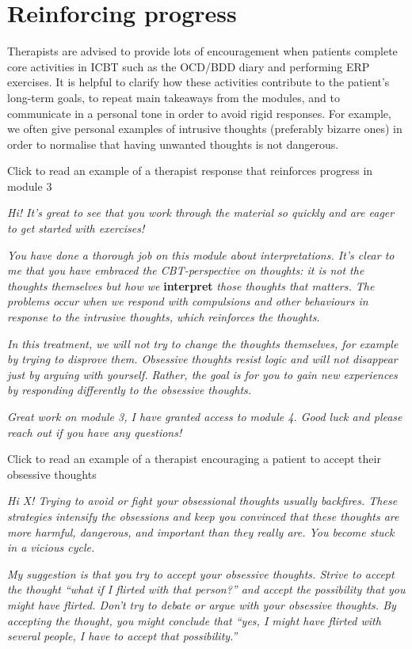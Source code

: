 \documentclass[]{book}
\theoremstyle{definition}
\theoremstyle{definition}
\theoremstyle{definition}
\theoremstyle{remark}
\begin{document}
\hypertarget{reinforcing-progress}{%
\section{Reinforcing progress}\label{reinforcing-progress}}

Therapists are advised to provide lots of encouragement when patients
complete core activities in ICBT such as the OCD/BDD diary and
performing ERP exercises. It is helpful to clarify how these activities
contribute to the patient's long-term goals, to repeat main takeaways
from the modules, and to communicate in a personal tone in order to
avoid rigid responses. For example, we often give personal examples of
intrusive thoughts (preferably bizarre ones) in order to normalise that
having unwanted thoughts is not dangerous.

 Click to read an example of a therapist response that reinforces
progress in module 3

\emph{Hi! It's great to see that you work through the material so
quickly and are eager to get started with exercises!}

\emph{You have done a thorough job on this module about interpretations.
It's clear to me that you have embraced the CBT-perspective on thoughts:
it is not the thoughts themselves but how we} \textbf{interpret}
\emph{those thoughts that matters. The problems occur when we respond
with compulsions and other behaviours in response to the intrusive
thoughts, which reinforces the thoughts.}

\emph{In this treatment, we will not try to change the thoughts
themselves, for example by trying to disprove them. Obsessive thoughts
resist logic and will not disappear just by arguing with yourself.
Rather, the goal is for you to gain new experiences by responding
differently to the obsessive thoughts.}

\emph{Great work on module 3, I have granted access to module 4. Good
luck and please reach out if you have any questions!}

 Click to read an example of a therapist encouraging a patient to accept
their obsessive thoughts

\emph{Hi X! Trying to avoid or fight your obsessional thoughts usually
backfires. These strategies intensify the obsessions and keep you
convinced that these thoughts are more harmful, dangerous, and important
than they really are. You become stuck in a vicious cycle.}

\emph{My suggestion is that you try to accept your obsessive thoughts.
Strive to accept the thought ``what if I flirted with that person?'' and
accept the possibility that you might have flirted. Don't try to debate
or argue with your obsessive thoughts. By accepting the thought, you
might conclude that ``yes, I might have flirted with several people, I
have to accept that possibility.''}
\end{document}
